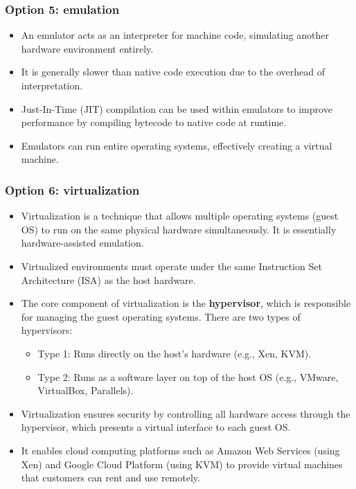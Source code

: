 \documentclass[12pt]{article}
\begin{document}
\subsubsection{Option 5: emulation}
\begin{itemize}
    \item An emulator acts as an interpreter for machine code, simulating another hardware environment entirely.
    \item It is generally slower than native code execution due to the overhead of interpretation.
    \item Just-In-Time (JIT) compilation can be used within emulators to improve performance by compiling bytecode to native code at runtime.
    \item Emulators can run entire operating systems, effectively creating a virtual machine.
\end{itemize}

\subsubsection{Option 6: virtualization}

\begin{itemize}
    \item Virtualization is a technique that allows multiple operating systems (guest OS) to run on the same physical hardware simultaneously. It is essentially hardware-assisted emulation.
    \item Virtualized environments must operate under the same Instruction Set Architecture (ISA) as the host hardware.
    \item The core component of virtualization is the \textbf{hypervisor}, which is responsible for managing the guest operating systems. There are two types of hypervisors:
    \begin{itemize}
        \item Type 1: Runs directly on the host's hardware (e.g., Xen, KVM).
        \item Type 2: Runs as a software layer on top of the host OS (e.g., VMware, VirtualBox, Parallels).
    \end{itemize}
    \item Virtualization ensures security by controlling all hardware access through the hypervisor, which presents a virtual interface to each guest OS.
    \item It enables cloud computing platforms such as Amazon Web Services (using Xen) and Google Cloud Platform (using KVM) to provide virtual machines that customers can rent and use remotely.
\end{itemize}
\end{document}
